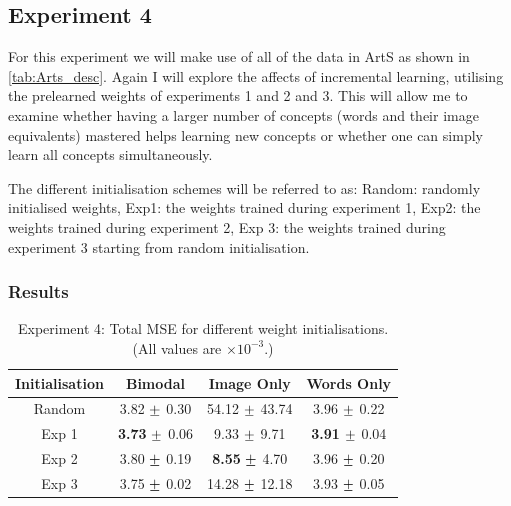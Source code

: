 \newpage
\subsection{Experiment 4}
For this experiment we will make use of all of the data in ArtS as shown in \autoref{tab:Arts_desc}. Again I will explore the affects of incremental learning, utilising the prelearned weights of experiments 1 and 2 and 3. This will allow me to examine whether having a larger number of concepts (words and their image equivalents) mastered  helps learning new concepts or whether one can simply learn all concepts simultaneously.

The different initialisation schemes will be referred to as: Random: randomly initialised weights, Exp1: the weights trained during experiment 1, Exp2: the weights trained during experiment 2, Exp 3: the weights trained during experiment 3 starting from random initialisation.
%

\subsubsection{Results}

\begin{table}[h!]
\centering
	\begin{tabular}{|c|c|c|c|}
	\hline
	\textbf{Initialisation} & 	\textbf{Bimodal} & 	\textbf{Image Only} 	& 	\textbf{Words Only} \\ \hline
Random 	&	3.82	$\mypm$	0.30	&	54.12	$\mypm$	43.74	&	3.96	$\mypm$	0.22	\\ \hline
Exp 1	&	\textbf{3.73}	$\mypm$	0.06	&	9.33	$\mypm$	9.71	&	\textbf{3.91}	$\mypm$	0.04\\ \hline
Exp 2	&	3.80	$\mypm$	0.19	&	\textbf{8.55}	$\mypm$	4.70	&	3.96	$\mypm$	0.20	\\ \hline
Exp 3	&	3.75	$\mypm$	0.02	&	14.28	$\mypm$	12.18	&	3.93	$\mypm$	0.05	\\ \hline

	\end{tabular}
\caption{Experiment 4: Total MSE for different weight initialisations. (All values are $\times10^{-3}$.)}
\label{tab:res739}
\end{table}

